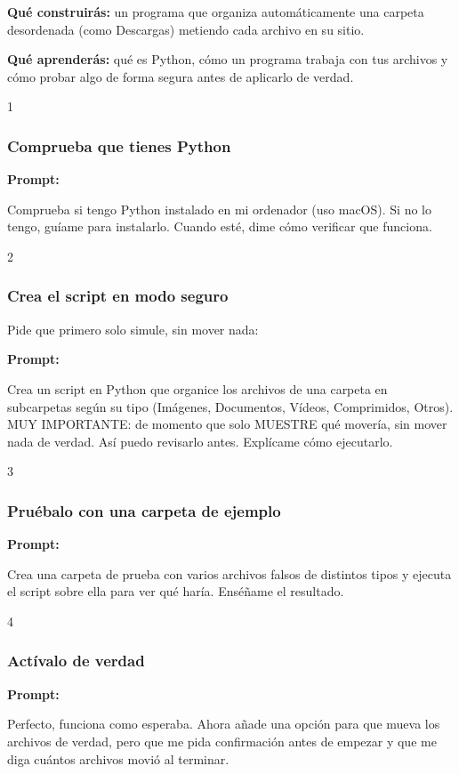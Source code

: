 \documentclass[11pt,a4paper]{report}
\begin{document}
\textbf{Qué construirás:} un programa que organiza automáticamente una carpeta desordenada (como Descargas) metiendo cada archivo en su sitio.

\textbf{Qué aprenderás:} qué es Python, cómo un programa trabaja con tus archivos y cómo probar algo de forma segura antes de aplicarlo de verdad.

1\subsubsection{Comprueba que tienes Python}

\noindent\textbf{Prompt: }
\begin{codebox}
Comprueba si tengo Python instalado en mi ordenador (uso macOS). Si no lo tengo, guíame para instalarlo. Cuando esté, dime cómo verificar que funciona.
\end{codebox}

2\subsubsection{Crea el script en modo seguro}

Pide que primero solo simule, sin mover nada:

\noindent\textbf{Prompt: }
\begin{codebox}
Crea un script en Python que organice los archivos de una carpeta en subcarpetas según su tipo (Imágenes, Documentos, Vídeos, Comprimidos, Otros). MUY IMPORTANTE: de momento que solo MUESTRE qué movería, sin mover nada de verdad. Así puedo revisarlo antes. Explícame cómo ejecutarlo.
\end{codebox}

3\subsubsection{Pruébalo con una carpeta de ejemplo}

\noindent\textbf{Prompt: }
\begin{codebox}
Crea una carpeta de prueba con varios archivos falsos de distintos tipos y ejecuta el script sobre ella para ver qué haría. Enséñame el resultado.
\end{codebox}

4\subsubsection{Actívalo de verdad}

\noindent\textbf{Prompt: }
\begin{codebox}
Perfecto, funciona como esperaba. Ahora añade una opción para que mueva los archivos de verdad, pero que me pida confirmación antes de empezar y que me diga cuántos archivos movió al terminar.
\end{codebox}
\end{document}
